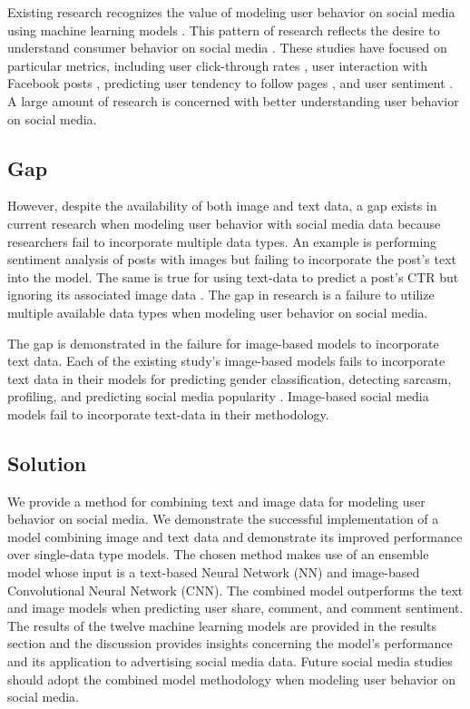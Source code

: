 \documentclass[mksc,blindrev]{informs3} %
\begin{document}
Existing research recognizes the value of modeling user behavior on social media using machine learning models \cite{Li2015, 8029313, Ohsawa2013, Liu2012, Li2015}. This pattern of research reflects the desire to understand consumer behavior on social media \cite{Fisher2009}. These studies have focused on particular metrics, including user click-through rates \cite{Li2015}, user interaction with Facebook posts \cite{8029313}, predicting user tendency to follow pages \cite{Ohsawa2013}, and user sentiment \cite{Liu2012,Wang2015}. A large amount of research is concerned with better understanding user behavior on social media.

\subsection{Gap}


However, despite the availability of both image and text data, a gap exists in current research when modeling user behavior with social media data because researchers fail to incorporate multiple data types. An example is performing sentiment analysis of posts with images \cite{Wang2015} but failing to incorporate the post's text into the model. The same is true for using text-data to predict a post's CTR but ignoring its associated image data \cite{Li2015}. The gap in research is a failure to utilize multiple available data types when modeling user behavior on social media.

The gap is demonstrated in the failure for image-based models to incorporate text data. Each of the existing study's image-based models fails to incorporate text data in their models for predicting gender classification, detecting sarcasm, profiling, and predicting social media popularity \cite{Hassner2015, Poria2016, Segalin2017, Gelli2015}. Image-based social media models fail to incorporate text-data in their methodology.

\subsection{Solution}
  
We provide a method for combining text and image data for modeling user behavior on social media. We demonstrate the successful implementation of a model combining image and text data and demonstrate its improved performance over single-data type models. The chosen method makes use of an ensemble model whose input is a text-based Neural Network (NN) and image-based Convolutional Neural Network (CNN). The combined model outperforms the text and image models when predicting user share, comment, and comment sentiment. The results of the twelve machine learning models are provided in the results section and the discussion provides insights concerning the model's performance and its application to advertising social media data. Future social media studies should adopt the combined model methodology when modeling user behavior on social media.
\end{document}
